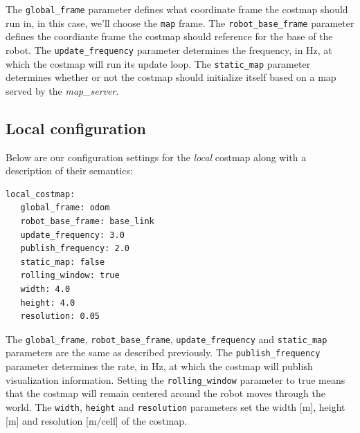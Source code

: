 The \texttt{global\_frame} parameter defines what coordinate frame the costmap should
run in, in this case, we'll choose the \texttt{map} frame. The \texttt{robot\_base\_frame}
parameter defines the coordiante frame the costmap should reference for the base 
of the robot. The \texttt{update\_frequency} parameter determines the frequency, in Hz, 
at which the costmap will run its update loop. The \texttt{static\_map} parameter 
determines whether or not the costmap should initialize itself based on a map served 
by the \textit{map\_server}.

\subsection{Local configuration}
Below are our configuration settings for the \textit{local} costmap along with a 
description of their semantics:
\begin{lstlisting}
local_costmap:
   global_frame: odom
   robot_base_frame: base_link
   update_frequency: 3.0
   publish_frequency: 2.0
   static_map: false
   rolling_window: true
   width: 4.0
   height: 4.0
   resolution: 0.05
\end{lstlisting}
The \texttt{global\_frame}, \texttt{robot\_base\_frame}, \texttt{update\_frequency}
and \texttt{static\_map} parameters are the same as described previously.
The \texttt{publish\_frequency} parameter determines the rate, in Hz, at which 
the costmap will publish visualization information. Setting the \texttt{rolling\_window}
parameter to true means that the costmap will remain centered around the robot moves 
through the world. The \texttt{width}, \texttt{height} and \texttt{resolution} 
parameters set the width [m], height [m] and resolution [m/cell] of the costmap.

